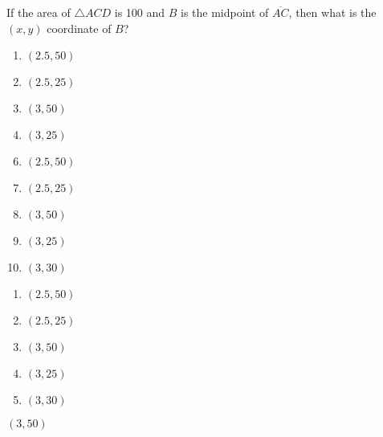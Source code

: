 







   If the area of $\triangle ACD$ is 100 and $B$ is the midpoint of $\overline{AC}$, then what is the $(x,y)$ coordinate of $B$?

\begin{center}
\end{center}



\ifsat
	\begin{enumerate}[label=\Alph*)]
		\item  $(2.5,50)$
		\item  $(2.5,25)$
		\item  $(3,50)$ %
		\item  $(3,25)$ 
	\end{enumerate}
\else
\fi

\ifacteven
	\begin{enumerate}[label=\textbf{\Alph*.},itemsep=\fill,align=left]
		\setcounter{enumii}{5}
		\item  $(2.5,50)$
		\item  $(2.5,25)$
		\item  $(3,50)$ %
		\addtocounter{enumii}{1}
		\item  $(3,25)$ 
		\item  $(3,30)$ 
	\end{enumerate}
\else
\fi

\ifactodd
	\begin{enumerate}[label=\textbf{\Alph*.},itemsep=\fill,align=left]
		\item  $(2.5,50)$
		\item  $(2.5,25)$
		\item  $(3,50)$ %
		\item  $(3,25)$ 
		\item  $(3,30)$ 
	\end{enumerate}
\else
\fi

\ifgridin
  $(3,50)$ %
		
\else
\fi

